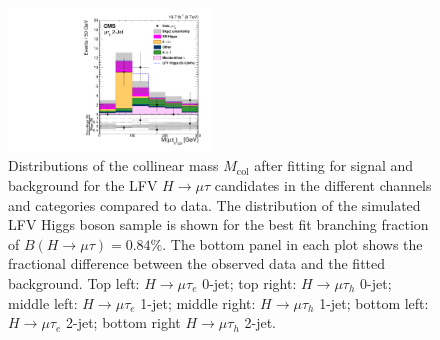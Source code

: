 \documentclass[oneside, letterpaper, oldfontcommands]{memoir}
\begin{document}
{{{\begin{figure}[hbtp]
 \includegraphics[width=0.48\textwidth]{muhad_VBF_m_colinear_UNBLIND_PostFit.pdf}
 \caption{Distributions of the collinear mass $M_\text{col}$ after fitting for signal and background  for the LFV $H \rightarrow \mu \tau$ candidates in
the different
channels and categories compared to data.
The distribution of the simulated LFV Higgs boson sample is shown for the best fit branching fraction
of $B(H \rightarrow \mu \tau )=0.84\%$.
The bottom panel in each plot shows the fractional difference between the observed data and the fitted background. Top left: $H \rightarrow \mu \tau_{e}$ 0-jet; top right: $H \rightarrow \mu \tau_{h}$ 0-jet;
middle left: $H \rightarrow \mu \tau_{e}$ 1-jet; middle right: $H \rightarrow \mu \tau_{h}$ 1-jet; bottom left: $H \rightarrow \mu \tau_{e}$ 2-jet; bottom right $H \rightarrow \mu \tau_{h}$ 2-jet.}
 \label{fig:Mcol_Postfit}\end{figure}

}}}
\end{document}
